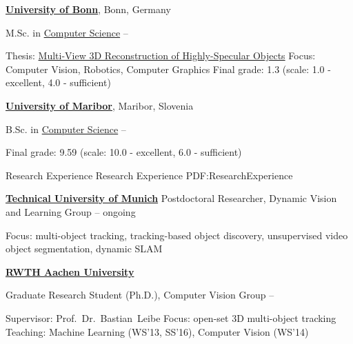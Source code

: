 \documentclass[letterpaper,MMMyyyy,nonstopmode]{simpleresumecv}
\begin{document}
\begin{Body}
\BigGap
\Entry
\href{https://www.uni-bonn.de/}
{\textbf{University of Bonn}},
Bonn, Germany

\Gap
\BulletItem
M.Sc. in
\href{https://www.informatik.uni-bonn.de/de/fuer-studierende/master-of-science-in-computer-science}
{Computer Science}
\hfill
{} --
\begin{Detail}
\SubBulletItem
Thesis:
\href{https://www.vision.rwth-aachen.de/media/papers/thesis_doc.pdf}
{Multi-View 3D Reconstruction of Highly-Specular Objects}
\SubBulletItem
Focus:
Computer Vision, Robotics, Computer Graphics
%
\SubBulletItem
Final grade: 1.3 (scale: 1.0 - excellent, 4.0 - sufficient)
\end{Detail}

\BigGap
\Entry
\href{https://www.um.si}
{\textbf{University of Maribor}},
Maribor, Slovenia

\Gap
\BulletItem
B.Sc. in
\href{https://feri.um.si/en/}
{Computer Science}
\hfill
{} --
\begin{Detail}
\SubBulletItem
Final grade: 9.59 (scale: 10.0 - excellent, 6.0 - sufficient)
\end{Detail}

\Section
{Research Experience}
{Research Experience}
{PDF:ResearchExperience}

\Entry
\href{https://www.tum.de/en/}
{\textbf{Technical University of Munich}}
\Gap
\BulletItem
Postdoctoral Researcher, Dynamic Vision and Learning Group 
\hfill
{} -- ongoing
\begin{Detail}
\SubBulletItem
Focus:
multi-object tracking, tracking-based object discovery, unsupervised video object segmentation, dynamic SLAM
\end{Detail}

\Entry
\href{http://www.rwth-aachen.de}
{\textbf{RWTH Aachen University}}

\Gap
\BulletItem
Graduate Research Student (Ph.D.), Computer Vision Group
\hfill
{} -- 
\begin{Detail}
\SubBulletItem
Supervisor:
Prof.~Dr.~Bastian~Leibe
\SubBulletItem
Focus:
open-set 3D multi-object tracking
\SubBulletItem
Teaching: Machine Learning (WS'13, SS'16), Computer Vision (WS'14)
\end{Detail}


\end{Body}
\end{document}
